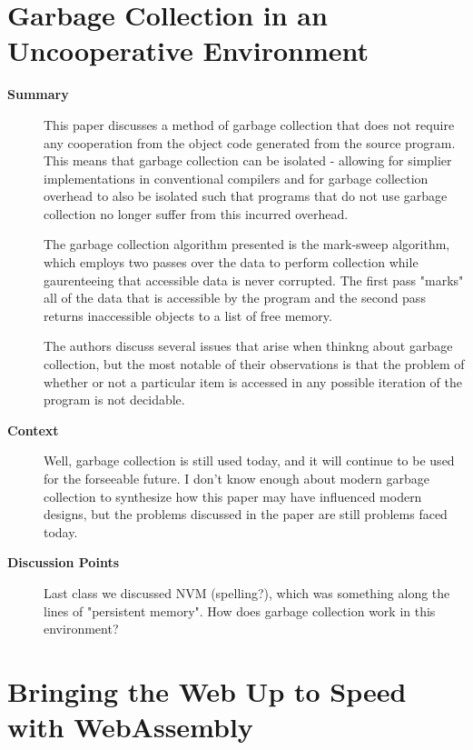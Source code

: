 \section {Garbage Collection in an Uncooperative Environment \cite{boehm1988garbage}}

\begin{description}
    \item[\textbf{Summary}]
    This paper discusses a method of garbage collection that does not require
    any cooperation from the object code generated from the source program.
    This means that garbage collection can be isolated - allowing for simplier
    implementations in conventional compilers and for garbage collection
    overhead to also be isolated such that programs that do not use garbage
    collection no longer suffer from this incurred overhead.
    
    The garbage collection algorithm presented is the mark-sweep algorithm, which employs
    two passes over the data to perform collection while gaurenteeing that
    accessible data is never corrupted. The first pass "marks" all of the data
    that is accessible by the program and the second pass returns inaccessible
    objects to a list of free memory.

    The authors discuss several issues that arise when thinkng about garbage
    collection, but the most notable of their observations is that the
    problem of whether or not a particular item is accessed in any possible
    iteration of the program is not decidable. 
    \item[\textbf{Context}]
    Well, garbage collection is still used today, and it will continue to be used
    for the forseeable future. I don't know enough about modern garbage collection
    to synthesize how this paper may have influenced modern designs, but the
    problems discussed in the paper are still problems faced today.
    \item[\textbf{Discussion Points}]
    Last class we discussed NVM (spelling?), which was something along the
    lines of "persistent memory". How does garbage collection work in this
    environment?
\end{description}

\section {Bringing the Web Up to Speed with WebAssembly \cite{haas2017bringing}}

